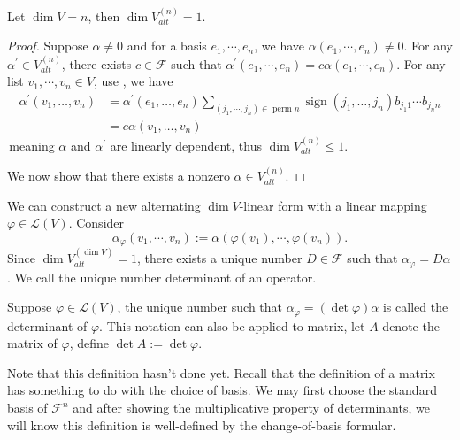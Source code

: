 \begin{theorem}
    Let $\dim V =n$, then $\dim V_{alt}^{(n)} = 1$.
\end{theorem}
\begin{proof}
    Suppose $\alpha\neq 0$ and for a basis $e_1,\cdots,e_n$, we have $\alpha(e_1,\cdots,e_n)\neq 0$. For any $\alpha^{\prime} \in V_{alt}^{(n)}$, there exists $c\in \mathcal{F}$ such that 
    $\alpha^{\prime} (e_1,\cdots,e_n) = c \alpha(e_1,\cdots,e_n)$. For any list $v_1,\cdots,v_n \in V$, use  , we have 
    $$\begin{aligned}
        \alpha^{\prime}(v_1, \ldots, v_n) &= \alpha^{\prime}(e_1, \ldots, e_n) \sum_{(j_1,\cdots, j_n) \in \operatorname{perm} n} \operatorname{sign}(j_1, \ldots, j_n) b_{j_1 1}\cdots b_{j_n n} \\
    &= c\alpha(v_1, \ldots, v_n)
    \end{aligned}$$
    \,meaning $\alpha$ and $\alpha^{\prime}$ are linearly dependent, thus $\dim V_{alt}^{(n)} \leq 1.$

    We now show that there exists a nonzero $\alpha \in V_{alt}^{(n)}$.
\end{proof}

We can construct a new alternating $\dim V$-linear form with a linear mapping $\varphi \in \mathcal{L}(V)$. Consider 
$$\alpha_{\varphi}(v_1,\cdots,v_n) := \alpha (\varphi(v_1),\cdots,\varphi(v_n)).$$
Since $\dim V_{alt}^{(\dim V)} = 1$, there exists a unique number $D \in \mathcal{F}$ such that $\alpha_{\varphi}= D\alpha$. We call the unique number determinant of an operator.

\begin{definition}[Determinant]
    Suppose $\varphi \in \mathcal{L}(V)$, the unique number such that $\alpha_{\varphi}= (\det \varphi)\alpha$ is called the determinant of $\varphi$. 
    This notation can also be applied to matrix, let $A$ denote the matrix of $\varphi$, define $\det A := \det \varphi$.
\end{definition}
\begin{note}
    Note that this definition hasn't done yet. Recall that the definition of a matrix has something to do with the choice of basis.
    We may first choose the standard basis of $\mathcal{F}^{n}$ and after showing the multiplicative property of determinants, we will know this definition is well-defined by the change-of-basis formular. 
\end{note}


